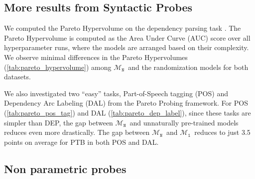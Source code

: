 \documentclass[letterpaper, 12pt]{report}
\newcommand{\OR}{$\mathcal{M}_{\texttt{N}}$}
\newcommand{\RI}{$\mathcal{M}_{\texttt{1}}$}
\begin{document}
\subsection{More results from Syntactic Probes}
\label{sec:mlm_pareto_probes}







We computed the Pareto Hypervolume on the dependency parsing task \citep{pimentel-etal-2020-pareto}. The Pareto Hypervolume is computed as the Area Under Curve (AUC) score over all hyperparameter runs, where the models are arranged based on their complexity. We observe minimal differences in the Pareto Hypervolumes (\autoref{tab:pareto_hypervolume}) among \OR\ and the randomization models for both datasets.

We also investigated two ``easy'' tasks, Part-of-Speech tagging (POS) and Dependency Arc Labeling (DAL) from the Pareto Probing framework.
For POS (\autoref{tab:pareto_pos_tag}) and DAL (\autoref{tab:pareto_dep_label}), since these tasks are simpler than DEP, the gap between \OR\ and unnaturally pre-trained models reduces even more drastically. The gap between \OR\ and \RI\ reduces to just 3.5 points on average for PTB in both POS and DAL.

\subsection{Non parametric probes}
\label{sec:mlm_non_par_probes}
\end{document}
